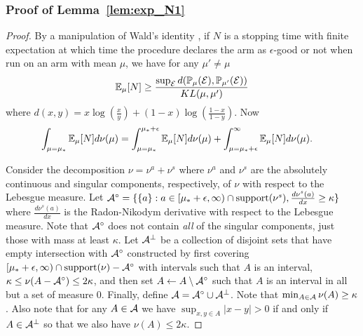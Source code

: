 \subsubsection{Proof of Lemma~\ref{lem:exp_N1}}

\begin{proof}
By a manipulation of Wald's identity \cite{WaldsLemma}, if $N$ is a stopping time with finite expectation at which time the procedure declares the arm as $\epsilon$-good or not when run on an arm with mean $\mu$, we have for any $\mu' \neq \mu$
\begin{align}
\mathbb{E}_\mu[N] \geq \frac{\sup_{\mathcal{E}} d( \mathbb{P}_\mu(\mathcal{E}), \mathbb{P}_{\mu'}(\mathcal{E}) )}{KL(\mu,\mu')} \label{eqn:wald}
\end{align}
where $d(x,y) = x \log(\frac{x}{y}) + (1-x) \log(\frac{1-x}{1-y})$.
Now
\begin{align*}
\int_{\mu=\mu_*} \mathbb{E}_\mu[N] d\nu(\mu) &= \int_{\mu=\mu_*}^{\mu_*+\epsilon} \mathbb{E}_\mu[N] d\nu(\mu) + \int_{\mu=\mu_*+\epsilon}^\infty \mathbb{E}_\mu[N] d\nu(\mu) .
\end{align*}


Consider the decomposition $\nu = \nu^a + \nu^s$ where $\nu^a$ and $\nu^s$ are the absolutely continuous and singular components, respectively, of $\nu$ with respect to the Lebesgue measure.
Let $\mathcal{A}^\circ = \{ \{a\} : a \in [\mu_* + \epsilon,\infty) \cap \mathrm{support}(\nu^s),  \frac{d\nu^s(a)}{dx} \geq \kappa \}$ where $\frac{d\nu^s(a)}{dx}$ is the Radon-Nikodym derivative with respect to the Lebesgue measure.
Note that $\mathcal{A}^\circ$ does not contain \emph{all} of the singular components, just those with mass at least $\kappa$.
Let $\mathcal{A}^\perp$ be a collection of disjoint sets that have empty intersection with $\mathcal{A}^\circ$ 
constructed by first covering $[\mu_* + \epsilon,\infty) \cap \mathrm{support}(\nu)-\mathcal{A}^\circ$ with intervals such that $A$ is an interval, $\kappa \leq \nu(A-\mathcal{A}^\circ) \leq 2 \kappa$, and then set $A \leftarrow A \setminus \mathcal{A}^\circ$ such that $A$ is an interval in all but a set of measure $0$.
Finally, define $\mathcal{A} = \mathcal{A}^\circ \cup \mathcal{A}^\perp$.
Note that $\min_{A \in \mathcal{A}} \nu(A) \geq \kappa$.
Also note that for any $A \in \mathcal{A}$ we have $\sup_{x,y \in A} |x-y| > 0$ if and only if $A \in \mathcal{A}^\perp$ so that we also have $\nu(A) \leq 2 \kappa$.  




\end{proof}
